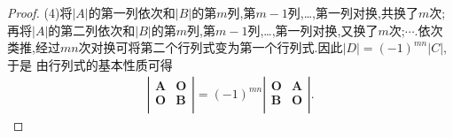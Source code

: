 \documentclass[lang=cn,newtx,10pt,scheme=chinese]{elegantbook}
\begin{document}
\begin{proof}
(4)将\(\vert A\vert\)的第一列依次和\(\vert B\vert\)的第\(m\)列,第\(m - 1\)列,…,第一列对换,共换了\(m\)次;再将\(\vert A\vert\)的第二列依次和\(\vert B\vert\)的第\(m\)列,第\(m - 1\)列,…,第一列对换,又换了\(m\)次;$\cdots$.依次类推,经过\(mn\)次对换可将第二个行列式变为第一个行列式.因此\(\vert D\vert=(-1)^{mn}\vert C\vert\),于是
由行列式的基本性质可得
\begin{align*}
    \left| \left. \begin{matrix}
        \boldsymbol{A}&		\boldsymbol{O}\\
        \boldsymbol{O}&		\boldsymbol{B}\\
    \end{matrix} \right. \right|=\left( -1 \right) ^{mn}\left. \left| \begin{matrix}
        \boldsymbol{O}&		\boldsymbol{A}\\
        \boldsymbol{B}&		\boldsymbol{O}\\
    \end{matrix} \right| \right. .
\end{align*}
\end{proof}
\end{document}
